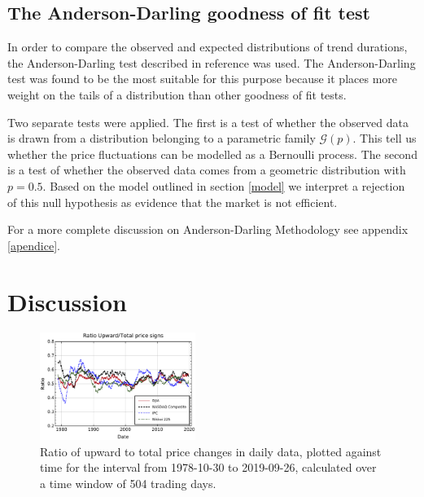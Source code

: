 \documentclass[a4paper]{jpconf}
\begin{document}
\subsection{The Anderson-Darling goodness of fit test}
In order to compare the observed and expected distributions of  trend durations, the Anderson-Darling test described in reference \cite{Anderson} was used. The Anderson-Darling test was found to be the most suitable for this purpose because it places more weight on the tails of a distribution than other goodness of fit tests.

Two separate tests were applied. The first is a test of whether the observed data is drawn from a distribution belonging to a parametric family $\mathcal{G}(p)$. This tell us whether the price fluctuations can be modelled as a Bernoulli process. The second is a test of whether the observed data comes from a geometric distribution with $p = 0.5$. Based on the model outlined in section \ref{model} we interpret a rejection of this null hypothesis as evidence that the market is not efficient.

For a more complete discussion on Anderson-Darling Methodology see appendix \ref{apendice}.

\section{Discussion}
\label{discussion}

\begin{figure}
\begin{center}
\includegraphics[width=0.45\textwidth]{img/sign_ratios}
\end{center}
\caption{\small \label{fig:simetria}Ratio of upward to total price changes in daily data, plotted against time for the interval from 1978-10-30 to 2019-09-26, calculated over a time window of 504 trading days.}
\end{figure}
\end{document}
